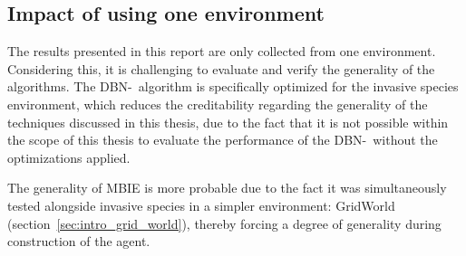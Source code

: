 \subsection{Impact of using one environment}
\label{sec:impact_of_one_env}

The results presented in this report are only collected from one environment.
Considering this, it is challenging to evaluate and verify the generality of the
algorithms. The DBN-\etre\ algorithm is specifically optimized for the invasive species
environment, which reduces the creditability regarding the generality of the
techniques discussed in this thesis, due to the fact that it is not possible
within the scope of this thesis to evaluate the performance of the DBN-\etre\,
without the optimizations applied. 

The generality of MBIE is more probable due to the fact it was simultaneously
tested alongside invasive species in a simpler environment: GridWorld
(section~\ref{sec:intro_grid_world}), thereby forcing a degree of generality during
construction of the agent.
